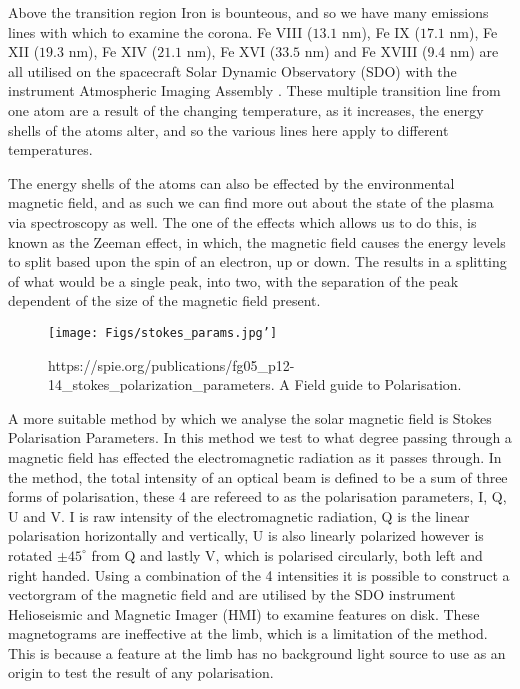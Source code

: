 Above the transition region Iron is bounteous, and so we have many emissions lines with which to examine the corona.
Fe VIII ($13.1$ nm), Fe IX ($17.1$ nm), Fe XII ($19.3$ nm), Fe XIV ($21.1$ nm), Fe XVI ($33.5$ nm) and Fe XVIII (9.4 nm) are all utilised on the spacecraft Solar Dynamic Observatory (SDO) with the instrument Atmospheric Imaging Assembly \cite{Schmelz2013}.
These multiple transition line from one atom are a result of the changing temperature, as it increases, the energy shells of the atoms alter, and so the various lines here apply to different temperatures.



The energy shells of the atoms can also be effected by the environmental magnetic field, and as such we can find more out about the state of the plasma via spectroscopy as well.
The one of the effects which allows us to do this, is known as the Zeeman effect, in which, the magnetic field causes the energy levels to split based upon the spin of an electron, up or down.
The results in a splitting of what would be a single peak, into two, with the separation of the peak dependent of the size of the magnetic field present. 


\begin{figure}
	\texttt{[image: Figs/stokes\_params.jpg']}
	\label{stokes}
	\caption{https://spie.org/publications/fg05_p12-14_stokes_polarization_parameters. A Field guide to Polarisation.}
\end{figure}

A more suitable method by which we analyse the solar magnetic field is Stokes Polarisation Parameters.
In this method we test to what degree passing through a magnetic field has effected the electromagnetic radiation as it passes through.
In the method, the total intensity of an optical beam is defined to be a sum of three forms of polarisation, these 4 are refereed to as the polarisation parameters, I, Q, U and V.
I is raw intensity of the electromagnetic radiation, Q is the linear polarisation horizontally and vertically, U is also linearly polarized however is rotated $\pm45^\circ$ from Q and lastly V, which is polarised circularly, both left and right handed.
Using a combination of the 4 intensities it is possible to construct a vectorgram of the magnetic field and are utilised by the SDO instrument Helioseismic and Magnetic Imager (HMI) to examine features on disk.
These magnetograms are ineffective at the limb, which is a limitation of the method.
This is because a feature at the limb has no background light source to use as an origin to test the result of any polarisation. 


